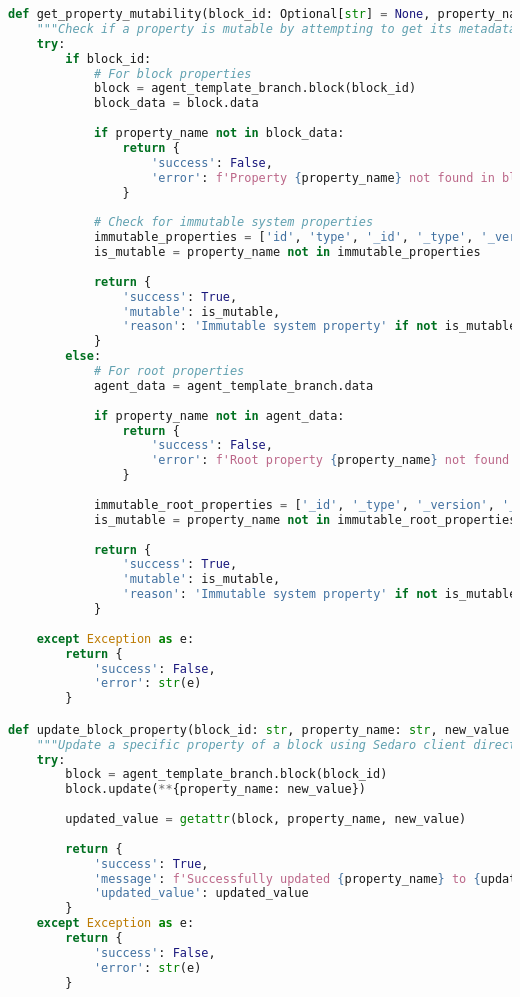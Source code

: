 \documentclass[12pt,a4paper]{article}
\begin{document}
\begin{lstlisting}[language=Python, caption=Property Management System]
def get_property_mutability(block_id: Optional[str] = None, property_name: Optional[str] = None) -> Dict[str, Any]:
    """Check if a property is mutable by attempting to get its metadata or trying a test update"""
    try:
        if block_id:
            # For block properties
            block = agent_template_branch.block(block_id)
            block_data = block.data
            
            if property_name not in block_data:
                return {
                    'success': False,
                    'error': f'Property {property_name} not found in block {block_id}'
                }
            
            # Check for immutable system properties
            immutable_properties = ['id', 'type', '_id', '_type', '_version', '_created', '_updated']
            is_mutable = property_name not in immutable_properties
            
            return {
                'success': True,
                'mutable': is_mutable,
                'reason': 'Immutable system property' if not is_mutable else 'Editable property'
            }
        else:
            # For root properties
            agent_data = agent_template_branch.data
            
            if property_name not in agent_data:
                return {
                    'success': False,
                    'error': f'Root property {property_name} not found'
                }
            
            immutable_root_properties = ['_id', '_type', '_version', '_created', '_updated']
            is_mutable = property_name not in immutable_root_properties
            
            return {
                'success': True,
                'mutable': is_mutable,
                'reason': 'Immutable system property' if not is_mutable else 'Editable property'
            }
            
    except Exception as e:
        return {
            'success': False,
            'error': str(e)
        }

def update_block_property(block_id: str, property_name: str, new_value: Any) -> Dict[str, Any]:
    """Update a specific property of a block using Sedaro client directly"""
    try:
        block = agent_template_branch.block(block_id)
        block.update(**{property_name: new_value})
        
        updated_value = getattr(block, property_name, new_value)
        
        return {
            'success': True,
            'message': f'Successfully updated {property_name} to {updated_value}',
            'updated_value': updated_value
        }
    except Exception as e:
        return {
            'success': False,
            'error': str(e)
        }
\end{lstlisting}
\end{document}
